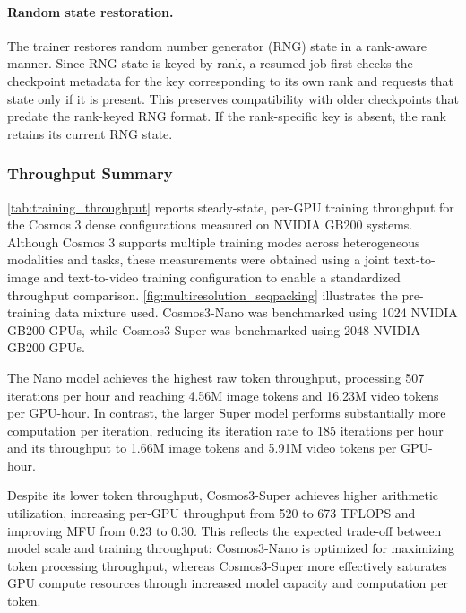 \paragraph{Random state restoration.} The trainer restores random number generator (RNG) state in a rank-aware manner. Since RNG state is keyed by rank, a resumed job first checks the checkpoint metadata for the key corresponding to its own rank and requests that state only if it is present. This preserves compatibility with older checkpoints that predate the rank-keyed RNG format. If the rank-specific key is absent, the rank retains its current RNG state.

\subsubsection{Throughput Summary}
\label{sec:training_throughput_summary}

\cref{tab:training_throughput} reports steady-state, per-GPU training throughput for the Cosmos 3 dense configurations measured on NVIDIA GB200 systems. Although Cosmos 3 supports multiple training modes across heterogeneous modalities and tasks, these measurements were obtained using a joint text-to-image and text-to-video training configuration to enable a standardized throughput comparison. \cref{fig:multiresolution_seqpacking} illustrates the pre-training data mixture used. Cosmos3-Nano was benchmarked using 1024 NVIDIA GB200 GPUs, while Cosmos3-Super was benchmarked using 2048 NVIDIA GB200 GPUs.

The Nano model achieves the highest raw token throughput, processing 507 iterations per hour and reaching 4.56M image tokens and 16.23M video tokens per GPU-hour. In contrast, the larger Super model performs substantially more computation per iteration, reducing its iteration rate to 185 iterations per hour and its throughput to 1.66M image tokens and 5.91M video tokens per GPU-hour.

Despite its lower token throughput, Cosmos3-Super achieves higher arithmetic utilization, increasing per-GPU throughput from 520 to 673 TFLOPS and improving MFU from 0.23 to 0.30. This reflects the expected trade-off between model scale and training throughput: Cosmos3-Nano is optimized for maximizing token processing throughput, whereas Cosmos3-Super more effectively saturates GPU compute resources through increased model capacity and computation per token.


